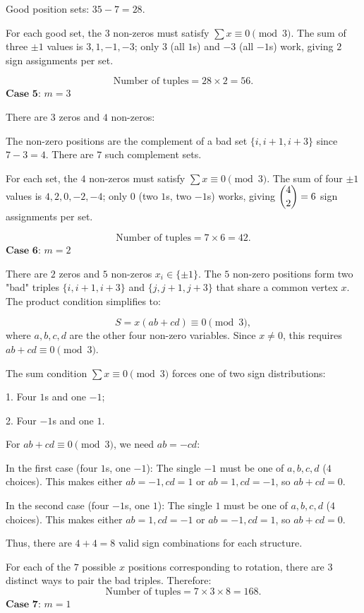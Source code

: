 \begin{enumerate}
 Good position sets: \(35 - 7 = 28\).

 For each good set, the \(3\) non-zeros must satisfy \(\sum x \equiv 0 \pmod{3}\). The sum of three \(\pm 1\) values is \(3, 1, -1, -3\); only \(3\) (all \(1\)s) and \(-3\) (all \(-1\)s) work, giving \(2\) sign assignments per set.

 
 \[\text{Number of tuples} = 28 \times 2 = 56.\]
$\textbf{Case 5}$: \(m = 3\)

 There are \(3\) zeros and \(4\) non-zeros:

 The non-zero positions are the complement of a bad set \(\{i, i+1, i+3\}\) since \(7-3=4\). There are \(7\) such complement sets.

 For each set, the \(4\) non-zeros must satisfy \(\sum x \equiv 0 \pmod{3}\). The sum of four \(\pm 1\) values is \(4, 2, 0, -2, -4\); only \(0\) (two \(1\)s, two \(-1\)s) works, giving \(\dbinom{4}{2} = 6\) sign assignments per set.

 
 \[\text{Number of tuples} = 7 \times 6 = 42.\]
$\textbf{Case 6}$: \(m = 2\)

 There are \(2\) zeros and \(5\) non-zeros \(x_i \in \{\pm 1\}\). The \(5\) non-zero positions form two "bad" triples \(\{i,i+1,i+3\}\) and \(\{j,j+1,j+3\}\) that share a common vertex \(x\). The product condition simplifies to:

 
 \[S = x(ab + cd) \equiv 0 \pmod{3},\]where \(a,b,c,d\) are the other four non-zero variables. Since \(x \neq 0\), this requires \(ab + cd \equiv 0 \pmod{3}\).

 The sum condition \(\sum x \equiv 0 \pmod{3}\) forces one of two sign distributions:

 1.  Four \(1\)s and one \(-1\);

 2.  Four \(-1\)s and one \(1\).

 For \(ab + cd \equiv 0 \pmod{3}\), we need \(ab = -cd\):

 In the first case (four \(1\)s, one \(-1\)): The single \(-1\) must be one of \(a,b,c,d\) (\(4\) choices). This makes either \(ab = -1, cd = 1\) or \(ab = 1, cd = -1\), so \(ab + cd = 0\).

 In the second case (four \(-1\)s, one \(1\)): The single \(1\) must be one of \(a,b,c,d\) (\(4\) choices). This makes either \(ab = 1, cd = -1\) or \(ab = -1, cd = 1\), so \(ab + cd = 0\).

 Thus, there are \(4 + 4 = 8\) valid sign combinations for each structure.

 For each of the \(7\) possible \(x\) positions corresponding to rotation, there are \(3\) distinct ways to pair the bad triples. Therefore:
 \[\text{Number of tuples} = 7 \times 3 \times 8 = 168.\]
$\textbf{Case 7}$: \(m = 1\)


\end{enumerate}
